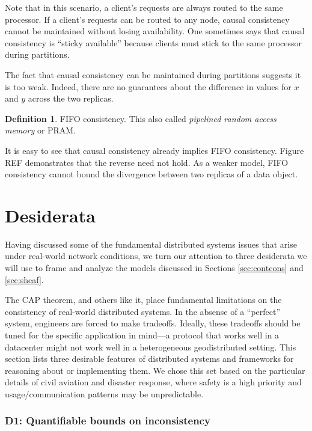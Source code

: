 \documentclass[]             %
{NASA}                       %
\theoremstyle{definition}
\newtheorem{definition}{Definition}[section]
\begin{document}
Note that in this scenario, a client's requests are always routed to the
same processor. If a client's requests can be routed to any node, causal
consistency cannot be maintained without losing availability. One
sometimes says that causal consistency is ``sticky available'' because
clients must stick to the same processor during partitions.

The fact that causal consistency can be maintained during partitions
suggests it is too weak. Indeed, there are no guarantees about the
difference in values for \(x\) and \(y\) across the two replicas.

\begin{definition}
    FIFO consistency. This also called \emph{pipelined random access memory} or PRAM.
\end{definition}

It is easy to see that causal consistency already implies FIFO
consistency. Figure REF demonstrates that the reverse need not hold. As
a weaker model, FIFO consistency cannot bound the divergence between two
replicas of a data object.

\hypertarget{desiderata}{%
\section{Desiderata}\label{desiderata}}

\label{sec:des}

Having discussed some of the fundamental distributed systems issues that
arise under real-world network conditions, we turn our attention to
three desiderata we will use to frame and analyze the models discussed
in Sections \ref{sec:contcons} and \ref{sec:sheaf}.

The CAP theorem, and others like it, place fundamental limitations on
the consistency of real-world distributed systems. In the absense of a
``perfect'' system, engineers are forced to make tradeoffs. Ideally,
these tradeoffs should be tuned for the specific application in mind---a
protocol that works well in a datacenter might not work well in a
heterogeneous geodistributed setting. This section lists three desirable
features of distributed systems and frameworks for reasoning about or
implementing them. We chose this set based on the particular details of
civil aviation and disaster response, where safety is a high priority
and usage/communication patterns may be unpredictable.

\hypertarget{d1-quantifiable-bounds-on-inconsistency}{%
\subsubsection{D1: Quantifiable bounds on
inconsistency}\label{d1-quantifiable-bounds-on-inconsistency}}
\end{document}
